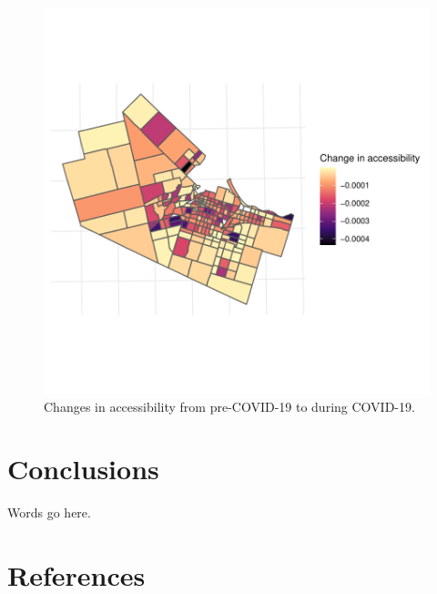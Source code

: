 \documentclass[]{elsarticle} %
\begin{document}
\begin{figure}

{\centering \includegraphics[width=1\linewidth]{Accessibility-Foodbanks-Hamilton_files/figure-latex/plot-accessibility-changes-1} 

}

\caption{\label{fig:accessibility-changes}Changes in accessibility from pre-COVID-19 to during COVID-19.}\label{fig:plot-accessibility-changes}
\end{figure}

\hypertarget{conclusions}{%
\section{Conclusions}\label{conclusions}}

Words go here.

\hypertarget{references}{%
\section*{References}\label{references}}
\end{document}
